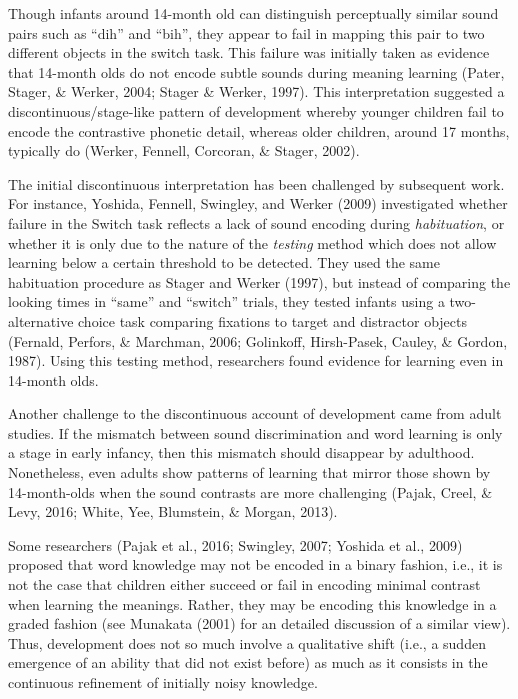 \documentclass[english,,man]{apa6}
\theoremstyle{definition}
\theoremstyle{definition}
\theoremstyle{definition}
\theoremstyle{remark}
\begin{document}
Though infants around 14-month old can distinguish perceptually similar
sound pairs such as \enquote{dih} and \enquote{bih}, they appear to fail
in mapping this pair to two different objects in the switch task. This
failure was initially taken as evidence that 14-month olds do not encode
subtle sounds during meaning learning (Pater, Stager, \& Werker, 2004;
Stager \& Werker, 1997). This interpretation suggested a
discontinuous/stage-like pattern of development whereby younger children
fail to encode the contrastive phonetic detail, whereas older children,
around 17 months, typically do (Werker, Fennell, Corcoran, \& Stager,
2002).

The initial discontinuous interpretation has been challenged by
subsequent work. For instance, Yoshida, Fennell, Swingley, and Werker
(2009) investigated whether failure in the Switch task reflects a lack
of sound encoding during \emph{habituation}, or whether it is only due
to the nature of the \emph{testing} method which does not allow learning
below a certain threshold to be detected. They used the same habituation
procedure as Stager and Werker (1997), but instead of comparing the
looking times in \enquote{same} and \enquote{switch} trials, they tested
infants using a two-alternative choice task comparing fixations to
target and distractor objects (Fernald, Perfors, \& Marchman, 2006;
Golinkoff, Hirsh-Pasek, Cauley, \& Gordon, 1987). Using this testing
method, researchers found evidence for learning even in 14-month olds.

Another challenge to the discontinuous account of development came from
adult studies. If the mismatch between sound discrimination and word
learning is only a stage in early infancy, then this mismatch should
disappear by adulthood. Nonetheless, even adults show patterns of
learning that mirror those shown by 14-month-olds when the sound
contrasts are more challenging (Pajak, Creel, \& Levy, 2016; White, Yee,
Blumstein, \& Morgan, 2013).

Some researchers (Pajak et al., 2016; Swingley, 2007; Yoshida et al.,
2009) proposed that word knowledge may not be encoded in a binary
fashion, i.e., it is not the case that children either succeed or fail
in encoding minimal contrast when learning the meanings. Rather, they
may be encoding this knowledge in a graded fashion (see Munakata (2001)
for an detailed discussion of a similar view). Thus, development does
not so much involve a qualitative shift (i.e., a sudden emergence of an
ability that did not exist before) as much as it consists in the
continuous refinement of initially noisy knowledge.
\end{document}
